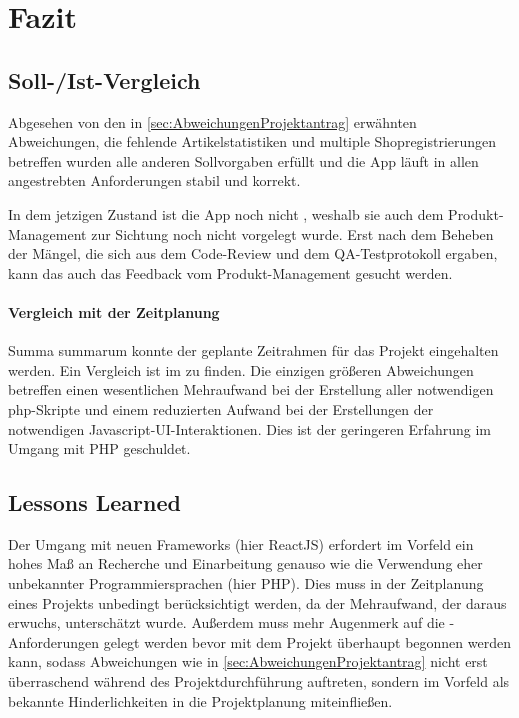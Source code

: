\section{Fazit} 
\label{sec:Fazit}

\subsection{Soll-/Ist-Vergleich}
\label{sec:SollIstVergleich}

Abgesehen von den in \ref{sec:AbweichungenProjektantrag} erwähnten Abweichungen, die fehlende Artikelstatistiken und multiple Shopregistrierungen betreffen wurden alle anderen Sollvorgaben erfüllt und die App läuft in allen angestrebten Anforderungen stabil und korrekt.

In dem jetzigen Zustand ist die App noch nicht , weshalb sie auch dem Produkt-Management zur Sichtung noch nicht vorgelegt wurde. Erst nach dem Beheben der Mängel, die sich aus dem Code-Review und dem QA-Testprotokoll ergaben, kann das auch das Feedback vom Produkt-Management gesucht werden.

\paragraph{Vergleich mit der Zeitplanung}
Summa summarum konnte der geplante Zeitrahmen für das Projekt eingehalten werden. Ein Vergleich ist im  zu finden. Die einzigen größeren Abweichungen betreffen einen wesentlichen Mehraufwand bei der Erstellung aller notwendigen php-Skripte und einem reduzierten Aufwand bei der Erstellungen der notwendigen Javascript-UI-Interaktionen. Dies ist der geringeren Erfahrung im Umgang mit PHP geschuldet.

\subsection{Lessons Learned}
\label{sec:LessonsLearned}

Der Umgang mit neuen Frameworks (hier ReactJS) erfordert im Vorfeld ein hohes Maß an Recherche und Einarbeitung genauso wie die Verwendung eher unbekannter Programmiersprachen (hier PHP). Dies muss in der Zeitplanung eines Projekts unbedingt berücksichtigt werden, da der Mehraufwand, der daraus erwuchs, unterschätzt wurde. Außerdem muss mehr Augenmerk auf die -Anforderungen gelegt werden bevor mit dem Projekt überhaupt begonnen werden kann, sodass Abweichungen wie in \ref{sec:AbweichungenProjektantrag} nicht erst überraschend während des Projektdurchführung auftreten, sondern im Vorfeld als bekannte Hinderlichkeiten in die Projektplanung miteinfließen.

